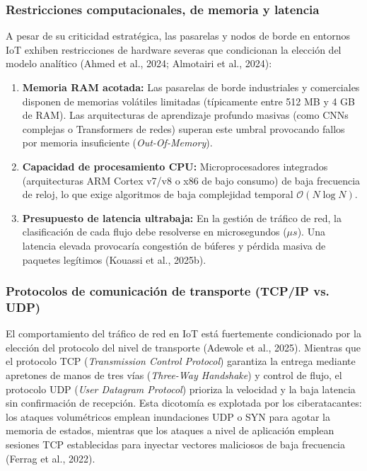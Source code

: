 \subsubsection{Restricciones computacionales, de memoria y latencia}
A pesar de su criticidad estratégica, las pasarelas y nodos de borde en entornos IoT exhiben restricciones de hardware severas que condicionan la elección del modelo analítico (Ahmed et al., 2024; Almotairi et al., 2024):
\begin{enumerate}
    \item \textbf{Memoria RAM acotada:} Las pasarelas de borde industriales y comerciales disponen de memorias volátiles limitadas (típicamente entre 512 MB y 4 GB de RAM). Las arquitecturas de aprendizaje profundo masivas (como CNNs complejas o Transformers de redes) superan este umbral provocando fallos por memoria insuficiente (\textit{Out-Of-Memory}).
    \item \textbf{Capacidad de procesamiento CPU:} Microprocesadores integrados (arquitecturas ARM Cortex v7/v8 o x86 de bajo consumo) de baja frecuencia de reloj, lo que exige algoritmos de baja complejidad temporal $\mathcal{O}(N \log N)$.
    \item \textbf{Presupuesto de latencia ultrabaja:} En la gestión de tráfico de red, la clasificación de cada flujo debe resolverse en microsegundos ($\mu s$). Una latencia elevada provocaría congestión de búferes y pérdida masiva de paquetes legítimos (Kouassi et al., 2025b).
\end{enumerate}

\subsubsection{Protocolos de comunicación de transporte (TCP/IP vs. UDP)}
El comportamiento del tráfico de red en IoT está fuertemente condicionado por la elección del protocolo del nivel de transporte (Adewole et al., 2025). Mientras que el protocolo TCP (\textit{Transmission Control Protocol}) garantiza la entrega mediante apretones de manos de tres vías (\textit{Three-Way Handshake}) y control de flujo, el protocolo UDP (\textit{User Datagram Protocol}) prioriza la velocidad y la baja latencia sin confirmación de recepción. Esta dicotomía es explotada por los ciberatacantes: los ataques volumétricos emplean inundaciones UDP o SYN para agotar la memoria de estados, mientras que los ataques a nivel de aplicación emplean sesiones TCP establecidas para inyectar vectores maliciosos de baja frecuencia (Ferrag et al., 2022).

